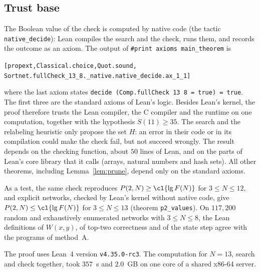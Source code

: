 \subsection{Trust base}
The Boolean value of the check is computed by native code (the tactic \texttt{native\_decide}): Lean compiles
the search and the check, runs them, and records the outcome as an axiom. The output of
\texttt{\#print axioms main\_theorem} is
\begin{alltt}\small
[propext, Classical.choice, Quot.sound,
 Sortnet.fullCheck_13_8._native.native_decide.ax_1_1]
\end{alltt}
where the last axiom states \texttt{decide (Comp.fullCheck 13 8 = true) = true}. The first three are the
standard axioms of Lean's logic. Besides Lean's kernel, the proof therefore trusts the Lean compiler, the C
compiler and the runtime on one computation, together with the hypothesis $S(11)\ge35$. The search and the
relabeling heuristic only propose the set $H$: an error in their code or in its compilation could make the check
fail, but not succeed wrongly. The result depends on the checking function, about $50$ lines of Lean, and on
the parts of Lean's core library that it calls (arrays, natural numbers and hash sets). All other theorems,
including Lemma~\ref{lem:prune}, depend only on the standard axioms.

As a test, the same check reproduces $P(2,N)\ge\cl{\lg F(N)}$ for $3\le N\le12$, and explicit networks,
checked by Lean's kernel without native code, give $P(2,N)\le\cl{\lg F(N)}$ for $3\le N\le13$ (theorem
\texttt{p2\_values}). On $117{,}200$ random and exhaustively enumerated networks with $3\le N\le8$, the Lean
definitions of $W(x,y)$, of top-two correctness and of the state step agree with the programs of method~A.

The proof uses Lean~4 version \texttt{v4.35.0-rc3}. The computation for $N=13$, search and check together,
took $357$~s and $2.0$~GB on one core of a shared x86-64 server.
